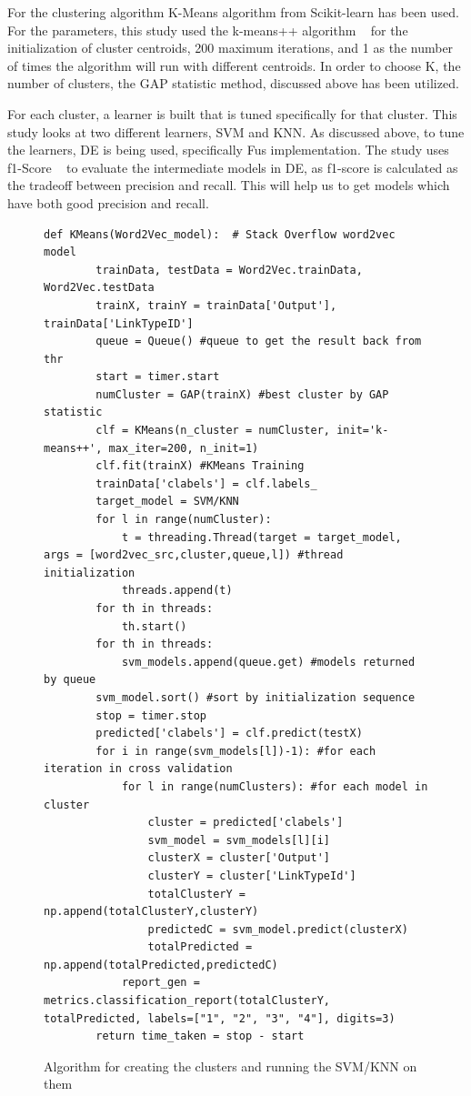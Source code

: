 \documentclass[sigconf]{acmart}
\theoremstyle{break}
\begin{document}
    For the clustering algorithm K-Means algorithm from Scikit-learn has been used. For the parameters, this study used the k-means++ algorithm ~\cite{arthur2007k} for the initialization of cluster centroids, 200 maximum iterations, and 1 as the number of times the algorithm will run with different centroids. In order to choose K, the number of clusters, the GAP statistic method, discussed above has been utilized.
    
    For each cluster, a learner is built that is tuned specifically for that cluster. This study looks at two different learners, SVM and KNN. As discussed above, to tune the learners, DE is being used, specifically Fu\textquotesingle s implementation. The study uses f1-Score ~\cite{sokolova2006beyond} to evaluate the intermediate models in DE, as f1-score is calculated as the tradeoff between precision and recall. This will help us to get models which have both good precision and recall.
    
    \begin{figure}[!t]
    \small 
    \begin{lstlisting}[mathescape,linewidth=8.5cm,frame=none,numbers=right ]
      def KMeans(Word2Vec_model):  # Stack Overflow word2vec model
        trainData, testData = Word2Vec.trainData, Word2Vec.testData
        trainX, trainY = trainData['Output'], trainData['LinkTypeID']
        queue = Queue() #queue to get the result back from thr
        start = timer.start
        numCluster = GAP(trainX) #best cluster by GAP statistic
        clf = KMeans(n_cluster = numCluster, init='k-means++', max_iter=200, n_init=1)
        clf.fit(trainX) #KMeans Training
        trainData['clabels'] = clf.labels_
        target_model = SVM/KNN
        for l in range(numCluster):
            t = threading.Thread(target = target_model, args = [word2vec_src,cluster,queue,l]) #thread initialization
            threads.append(t)
        for th in threads:
            th.start()
        for th in threads:
            svm_models.append(queue.get) #models returned by queue
        svm_model.sort() #sort by initialization sequence
        stop = timer.stop
        predicted['clabels'] = clf.predict(testX)
        for i in range(svm_models[l])-1): #for each iteration in cross validation
            for l in range(numClusters): #for each model in cluster
                cluster = predicted['clabels'] 
                svm_model = svm_models[l][i]
                clusterX = cluster['Output']
                clusterY = cluster['LinkTypeId']
                totalClusterY = np.append(totalClusterY,clusterY)
                predictedC = svm_model.predict(clusterX)
                totalPredicted = np.append(totalPredicted,predictedC)
            report_gen = metrics.classification_report(totalClusterY, totalPredicted, labels=["1", "2", "3", "4"], digits=3)
        return time_taken = stop - start   
    \end{lstlisting} 
    \caption{Algorithm for creating the clusters and running the SVM/KNN on them}
    \label{fig:pseudo_KMeans} 
    \vspace{-0.3cm}
    \end{figure}
    
\end{document}

